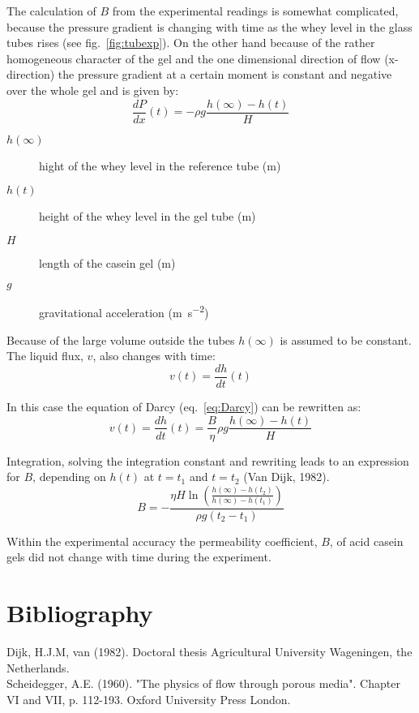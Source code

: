 \documentclass[12pt,a4paper]{article}
\begin{document}
The calculation of $B$ from the experimental readings is somewhat complicated, because the pressure gradient is changing with time as the whey level in the glass tubes rises (see fig.~\ref{fig:tubexp}). On the other hand because of the rather homogeneous character of the gel and the one dimensional direction of flow (x-direction) the pressure gradient at a certain moment is constant and negative over the whole gel and is given by:
\begin{equation}
\frac{dP}{dx}(t) = -\rho g\frac{h(\infty)-h(t)}{H}
\end{equation}
\begin{description}
\item[$h(\infty)$] hight of the whey level in the reference tube (\si{\metre})
\item[$h(t)$] height of the whey level in the gel tube (\si{\metre})
\item[$H$] length of the casein gel (\si{\metre})
\item[$g$] gravitational acceleration (\si{\metre\per\square\second})
\end{description}

Because of the large volume outside the tubes $h(\infty)$ is assumed to be constant. The liquid flux, $v$, also changes with time:
\begin{equation}
v(t) = \frac{dh}{dt}(t)
\end{equation}

In this case the equation of Darcy (eq.~\eqref{eq:Darcy}) can be rewritten as:
\begin{equation}
 v(t) = \frac{dh}{dt}(t) = \frac{B}{\eta}\rho g\frac{h(\infty)-h(t)}{H}
\end{equation}

Integration, solving the integration constant and rewriting leads to an expression for $B$, depending on $h(t)$ at $t=t_1$ and $t=t_2$ (Van Dijk, 1982).
\begin{equation}
B = -\frac{\eta H \ln\left(\frac{h(\infty)-h(t_2)}{h(\infty)-h(t_1)}\right)}{\rho g (t_2-t_1)}
\end{equation}

Within the experimental accuracy the permeability coefficient, $B$, of acid casein gels did not change with time during the experiment.

\section*{Bibliography}
Dijk, H.J.M, van (1982). Doctoral thesis Agricultural University Wageningen, the Netherlands.\\
Scheidegger, A.E. (1960). "The physics of flow through porous media". Chapter VI and VII, p. 112-193. Oxford University Press London.\\
\end{document}
